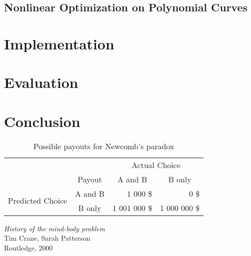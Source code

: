 \documentclass[a4paper]{article}
\begin{document}

		\subsection{Nonlinear Optimization on Polynomial Curves}


	\section{Implementation}

	\section{Evaluation}

	\section{Conclusion}

		\begin{table}[htbp]
			\centering
			\begin{tabular}{c|c|r|r|}
				\multicolumn{1}{c}{} & \multicolumn{1}{c}{} & \multicolumn{2}{c}{Actual Choice} \\
				\cline{2-4}
				& Payout & \multicolumn{1}{|c|}{A and B} & \multicolumn{1}{|c|}{B only} \\
				\cline{2-4}
				\multirow{2}{*}{Predicted Choice} & A and B & 1 000 \$ & 0 \$ \\
				\cline{2-4}
				& B only & 1 001 000 \$ & 1 000 000 \$ \\
				\cline{2-4}
			\end{tabular}
			\caption{Possible payouts for Newcomb's paradox}
			\label{table:NewcombParadoxPayouts}
		\end{table}

	\begin{thebibliography}{}

			\emph{History of the mind-body problem}\\
			Tim Crane, Sarah Patterson\\
			Routledge, 2000

	\end{thebibliography}
\end{document}
